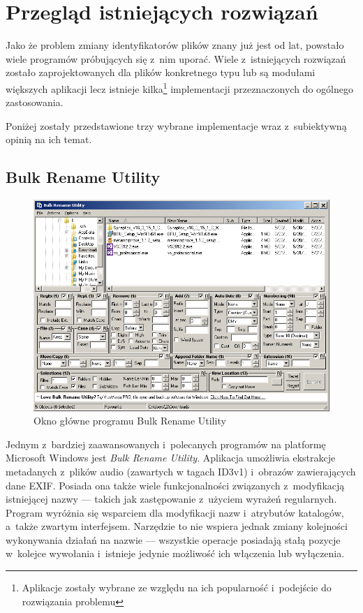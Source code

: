 \chapter{Przegląd istniejących rozwiązań}
\par
Jako że problem zmiany identyfikatorów plików znany już jest od lat, powstało wiele programów próbujących się z~nim uporać. Wiele z~istniejących rozwiązań zostało zaprojektowanych dla plików konkretnego typu lub są modułami większych aplikacji lecz istnieje kilka\footnote{Aplikacje zostały wybrane ze względu na ich popularność i~podejście do rozwiązania problemu} implementacji przeznaczonych do ogólnego zastosowania.
\par
Poniżej zostały przedstawione trzy wybrane implementacje wraz z~subiektywną opinią na ich temat.

\section{Bulk Rename Utility}
\begin{figure}[h]
\begin{center}
\includegraphics[scale=0.75]{img/bulkrename_window.png}
\end{center}
\caption{Okno główne programu Bulk Rename Utility}
\end{figure}

\par
Jednym z~bardziej zaawansowanych i~polecanych programów na platformę Microsoft Windows jest \textit{Bulk Rename Utility}. Aplikacja umożliwia ekstrakcje metadanych z~plików audio (zawartych w tagach ID3v1) i~obrazów zawierających dane EXIF. Posiada ona także wiele funkcjonalności związanych z~modyfikacją istniejącej nazwy --- takich jak zastępowanie z~użyciem wyrażeń regularnych.
Program wyróżnia się wsparciem dla modyfikacji nazw i~atrybutów katalogów, a~także zwartym interfejsem.
Narzędzie to nie wspiera jednak zmiany kolejności wykonywania działań na nazwie --- wszystkie operacje posiadają stałą pozycje w~kolejce wywołania i~istnieje jedynie możliwość ich włączenia lub wyłączenia.\\

